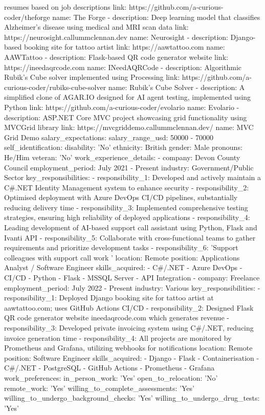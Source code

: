 \documentclass{resume}
\begin{document}
    resumes based on job descriptions
  link: https://github.com/a-curious-coder/theforge
  name: The Forge
- description: Deep learning model that classifies Alzheimer's disease using medical
    and MRI scan data
  link: https://neurosight.callummclennan.dev
  name: Neurosight
- description: Django-based booking site for tattoo artist
  link: https://aawtattoo.com
  name: AAWTattoo
- description: Flask-based QR code generator website
  link: https://ineedaqrcode.com
  name: INeedAQRCode
- description: Algorithmic Rubik's Cube solver implemented using Processing
  link: https://github.com/a-curious-coder/rubiks-cube-solver
  name: Rubik's Cube Solver
- description: A simplified clone of AGAR.IO designed for AI agent testing, implemented
    using Python
  link: https://github.com/a-curious-coder/evolario
  name: Evolario
- description: ASP.NET Core MVC project showcasing grid functionality using MVCGrid
    library
  link: https://mvcgriddemo.callummclennan.dev/
  name: MVC Grid Demo
salary_expectations:
  salary_range_usd: 50000 - 70000
self_identification:
  disability: 'No'
  ethnicity: British
  gender: Male
  pronouns: He/Him
  veteran: 'No'
work_experience_details:
- company: Devon County Council
  employment_period: July 2021 - Present
  industry: Government/Public Sector
  key_responsibilities:
  - responsibility_1: Developed and actively maintain a C#.NET Identity Management
      system to enhance security
  - responsibility_2: Optimised deployment with Azure DevOps CI/CD pipelines, substantially
      reducing delivery time
  - responsibility_3: Implemented comprehensive testing strategies, ensuring high
      reliability of deployed applications
  - responsibility_4: Leading development of AI-based support call assistant using
      Python, Flask and Ivanti API
  - responsibility_5: Collaborate with cross-functional teams to gather requirements
      and prioritize development tasks
  - responsibility_6: 'Support colleagues with support call work '
  location: Remote
  position: Applications Analyst / Software Engineer
  skills_acquired:
  - C#/.NET
  - Azure DevOps
  - CI/CD
  - Python
  - Flask
  - MSSQL Server
  - API Integration
- company: Freelance
  employment_period: July 2022 - Present
  industry: Various
  key_responsibilities:
  - responsibility_1: Deployed Django booking site for tattoo artist at aawtattoo.com;
      uses GitHub Actions CI/CD
  - responsibility_2: Designed Flask QR code generator website ineedaqrcode.com which
      generates revenue
  - responsibility_3: Developed private invoicing system using C#/.NET, reducing invoice
      generation time
  - responsibility_4: All projects are monitored by Prometheus and Grafana, utilizing
      webhooks for notifications
  location: Remote
  position: Software Engineer
  skills_acquired:
  - Django
  - Flask
  - Containerisation
  - C#/.NET
  - PostgreSQL
  - GitHub Actions
  - Prometheus
  - Grafana
work_preferences:
  in_person_work: 'Yes'
  open_to_relocation: 'No'
  remote_work: 'Yes'
  willing_to_complete_assessments: 'Yes'
  willing_to_undergo_background_checks: 'Yes'
  willing_to_undergo_drug_tests: 'Yes'
\end{document}
